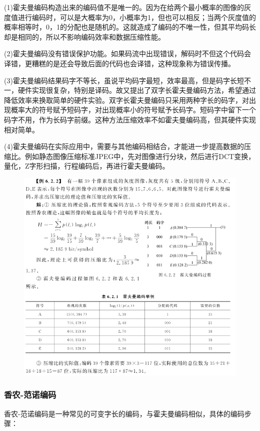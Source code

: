 \documentclass[11pt]{article}
\begin{document}
(1)霍夫曼编码构造出来的编码值不是唯一的。因为在给两个最小概率的图像的灰度值进行编码时，可以是大概率为0，小概率为1，但也可以相反；当两个灰度值的概率相等时，0，1的分配也是随机的。这就造成了编码的不唯一性，但其平均码长却是相同的，所以不影响编码效率和数据压缩性能。

(2)霍夫曼编码没有错误保护功能。如果码流中出现错误，解码时不但这个代码会译错，更糟糕的是还会导致后面的代码也会译错，这种现象称为错误传播。

(3)霍夫曼编码结果码字不等长，虽说平均码字最短，效率最高，但是码字长短不一，硬件实现很复杂，特别是译码。故又提出了双字长霍夫曼编码方法，希望通过降低效率来换取简单的硬件实验。双字长霍夫曼编码只采用两种字长的码字，对出现概率大的符号赋予短码字，对出现概率小的符号赋予长码字。短码字中留下一个码字不用，作为长码字前缀。这种方法压缩效率不如霍夫曼编码高，但其硬件实现相对简单。

(4)霍夫曼编码在实际应用中，需要与其他编码相结合，才能进一步提高数据的压缩比。例如静态图像压缩标准JPEG中，先对图像进行分块，然后进行DCT变换，量化，Z字形扫描，行程编码后，再进行霍夫曼编码。
\begin{figure}[H]
	\centering
	\includegraphics[scale=0.6]{39}
\end{figure}

\subsubsection{香农-范诺编码}
香农-范诺编码是一种常见的可变字长的编码，与霍夫曼编码相似，具体的编码步骤：
\end{document}
